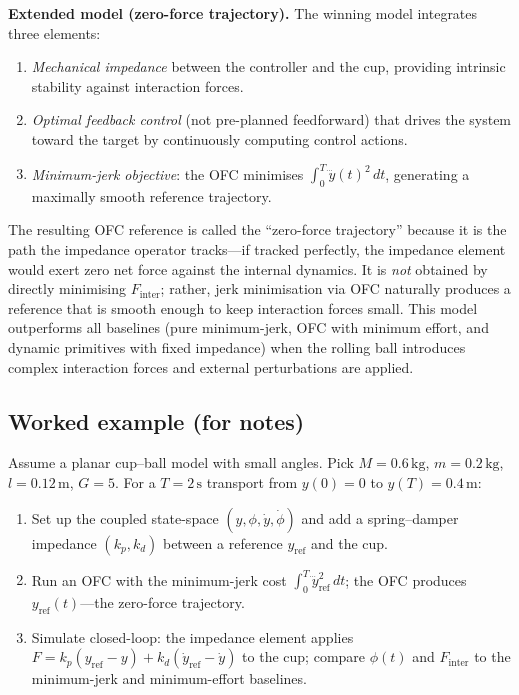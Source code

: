\documentclass[11pt]{article}
\begin{document}
\textbf{Extended model (zero-force trajectory).}
The winning model integrates three elements:
\begin{enumerate}[leftmargin=1.5em]
  \item \emph{Mechanical impedance} between the controller and the cup, providing intrinsic stability against interaction forces.
  \item \emph{Optimal feedback control} (not pre-planned feedforward) that drives the system toward the target by continuously computing control actions.
  \item \emph{Minimum-jerk objective}: the OFC minimises $\int_0^T \dddot{y}(t)^2\,dt$, generating a maximally smooth reference trajectory.
\end{enumerate}
The resulting OFC reference is called the ``zero-force trajectory'' because it is the path the impedance operator tracks---if tracked perfectly, the impedance element would exert zero net force against the internal dynamics.  It is \emph{not} obtained by directly minimising $F_{\text{inter}}$; rather, jerk minimisation via OFC naturally produces a reference that is smooth enough to keep interaction forces small.  This model outperforms all baselines (pure minimum-jerk, OFC with minimum effort, and dynamic primitives with fixed impedance) when the rolling ball introduces complex interaction forces and external perturbations are applied.

\subsection*{Worked example (for notes)}
Assume a planar cup--ball model with small angles. Pick $M=0.6\,\mathrm{kg}$, $m=0.2\,\mathrm{kg}$, $l=0.12\,\mathrm{m}$, $G=5$. For a $T=2\,\mathrm{s}$ transport from $y(0)=0$ to $y(T)=0.4\,\mathrm{m}$:
\begin{enumerate}[leftmargin=1.2em]
  \item Set up the coupled state-space $(y,\phi,\dot{y},\dot{\phi})$ and add a spring--damper impedance $(k_p,k_d)$ between a reference $y_{\text{ref}}$ and the cup.
  \item Run an OFC with the minimum-jerk cost $\int_0^T \dddot{y}_{\text{ref}}^2\,dt$; the OFC produces $y_{\text{ref}}(t)$---the zero-force trajectory.
  \item Simulate closed-loop: the impedance element applies $F = k_p(y_{\text{ref}}-y)+k_d(\dot{y}_{\text{ref}}-\dot{y})$ to the cup; compare $\phi(t)$ and $F_{\text{inter}}$ to the minimum-jerk and minimum-effort baselines.
\end{enumerate}
\end{document}

